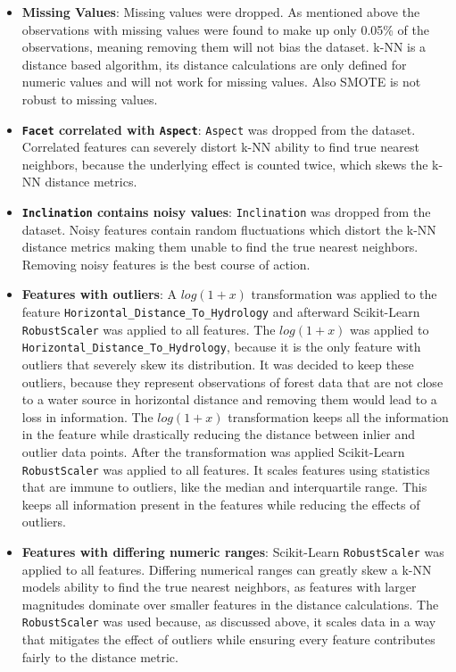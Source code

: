 \documentclass[conference]{IEEEtran}
\begin{document}
\begin{itemize}
    \item \textbf{Missing Values}: Missing values were dropped. As mentioned above the observations with missing values were found to make up only 0.05\% of the observations, meaning removing them will not bias the dataset. k-NN is a distance based algorithm, its distance calculations are only defined for numeric values and will not work for missing values. Also SMOTE is not robust to missing values. 
    \item \textbf{\texttt{Facet} correlated with \texttt{Aspect}}: \texttt{Aspect} was dropped from the dataset. Correlated features can severely distort k-NN ability to find true nearest neighbors, because the underlying effect is counted twice, which skews the k-NN distance metrics.
    \item \textbf{\texttt{Inclination} contains noisy values}: \texttt{Inclination} was dropped from the dataset. Noisy features contain random fluctuations which distort the k-NN distance metrics making them unable to find the true nearest neighbors. Removing noisy features is the best course of action.
    \item \textbf{Features with outliers}: A $log(1 + x)$ transformation was applied to the feature \texttt{Horizontal\_Distance\_To\_Hydrology} and afterward Scikit-Learn \texttt{RobustScaler} was applied to all features. The $log(1 + x)$ was applied to \texttt{Horizontal\_Distance\_To\_Hydrology}, because it is the only feature with outliers that severely skew its distribution. It was decided to keep these outliers, because they represent observations of forest data that are not close to a water source in horizontal distance and removing them would lead to a loss in information. The $log(1 + x)$ transformation keeps all the information in the feature while drastically reducing the distance between inlier and outlier data points. After the transformation was applied Scikit-Learn \texttt{RobustScaler} was applied to all features. It scales features using statistics that are immune to outliers, like the median and interquartile range. This keeps all information present in the features while reducing the effects of outliers.
    \item \textbf{Features with differing numeric ranges}: Scikit-Learn \texttt{RobustScaler} was applied to all features. Differing numerical ranges can greatly skew a k-NN models ability to find the true nearest neighbors, as features with larger magnitudes dominate over smaller features in the distance calculations. The \texttt{RobustScaler} was used because, as discussed above, it scales data in a way that mitigates the effect of outliers while ensuring every feature contributes fairly to the distance metric.

\end{itemize}
\end{document}
